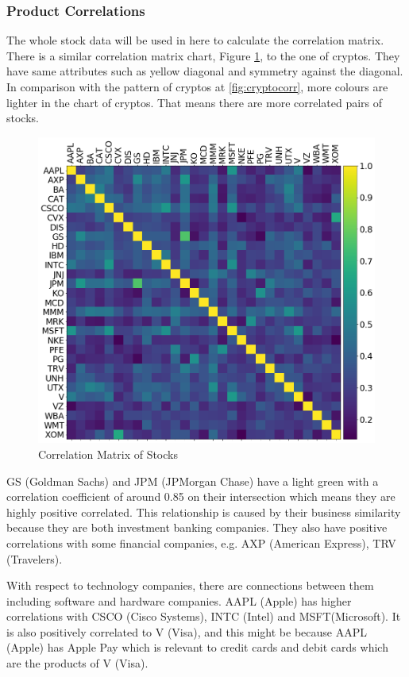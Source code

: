 \documentclass[11pt]{article} %
\theoremstyle{plain}
\theoremstyle{definition}
\begin{document}
\subsubsection{Product Correlations}

The whole stock data will be used in here to calculate the correlation matrix. There is a similar correlation matrix chart, Figure \ref{fig:stockcorr}, to the one of cryptos. They have same attributes such as yellow diagonal and symmetry against the diagonal. In comparison with the pattern of cryptos at \ref{fig:cryptocorr}, more colours are lighter in the chart of cryptos. That means there are more correlated pairs of stocks.

\begin{figure}[ht]
    \includegraphics[width=1\linewidth, center]{resources/stock_corr.png}
    \caption{Correlation Matrix of Stocks}
    \label{fig:stockcorr}
\end{figure}

GS (Goldman Sachs) and JPM (JPMorgan Chase) have a light green with a correlation coefficient of around 0.85 on their intersection which means they are highly positive correlated. This relationship is caused by their business similarity because they are both investment banking companies. They also have positive correlations with some financial companies, e.g. AXP (American Express), TRV (Travelers).

With respect to technology companies, there are connections between them including software and hardware companies. AAPL (Apple) has higher correlations with CSCO (Cisco Systems), INTC (Intel) and MSFT(Microsoft). It is also positively correlated to V (Visa), and this might be because AAPL (Apple) has Apple Pay which is relevant to credit cards and debit cards which are the products of V (Visa).
\end{document}
